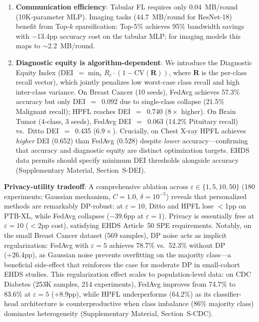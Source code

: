 \documentclass[conference,a4paper]{IEEEtran}
\begin{document}
\begin{enumerate}
    \item \textbf{Communication efficiency}: Tabular FL requires only 0.04~MB/round (10K-parameter MLP). Imaging tasks (44.7~MB/round for ResNet-18) benefit from Top-$k$ sparsification: Top-5\% achieves 95\% bandwidth savings with $-$13.4pp accuracy cost on the tabular MLP; for imaging models this maps to $\sim$2.2~MB/round.

    \item \textbf{Diagnostic equity is algorithm-dependent}: We introduce the Diagnostic Equity Index (DEI~$= \min_c R_c \cdot (1 - \text{CV}(\mathbf{R}))$, where $\mathbf{R}$ is the per-class recall vector), which jointly penalizes low worst-case class recall and high inter-class variance. On Breast Cancer (10 seeds), FedAvg achieves 57.3\% accuracy but only DEI~$=$~0.092 due to single-class collapse (21.5\% Malignant recall); HPFL reaches DEI~$=$~0.740 ($8\times$ higher). On Brain Tumor (4-class, 3 seeds), FedAvg DEI~$=$~0.063 (14.2\% Pituitary recall) vs.\ Ditto DEI~$=$~0.435 ($6.9\times$). Crucially, on Chest X-ray HPFL achieves \textit{higher} DEI (0.652) than FedAvg (0.528) despite \textit{lower} accuracy---confirming that accuracy and diagnostic equity are distinct optimization targets. EHDS data permits should specify minimum DEI thresholds alongside accuracy (Supplementary Material, Section~S-DEI).
\end{enumerate}

\textbf{Privacy-utility tradeoff}: A comprehensive ablation across $\varepsilon \in \{1, 5, 10, 50\}$ (180 experiments; Gaussian mechanism, $C{=}1.0$, $\delta{=}10^{-5}$) reveals that personalized methods are remarkably DP-robust: at $\varepsilon{=}10$, Ditto and HPFL lose $<$1pp on PTB-XL, while FedAvg collapses ($-$39.6pp at $\varepsilon{=}1$). Privacy is essentially free at $\varepsilon{=}10$ ($<$2pp cost), satisfying EHDS Article~50 SPE requirements. Notably, on the small Breast Cancer dataset (569 samples), DP noise acts as implicit regularization: FedAvg with $\varepsilon{=}5$ achieves 78.7\% vs.\ 52.3\% without DP (+26.4pp), as Gaussian noise prevents overfitting on the majority class---a beneficial side-effect that reinforces the case for moderate DP in small-cohort EHDS studies. This regularization effect scales to population-level data: on CDC Diabetes (253K samples, 214 experiments), FedAvg improves from 74.7\% to 83.6\% at $\varepsilon{=}5$ ($+$8.9pp), while HPFL underperforms (64.2\%) as its classifier-head architecture is counterproductive when class imbalance (86\% majority class) dominates heterogeneity (Supplementary Material, Section~S-CDC).
\end{document}
